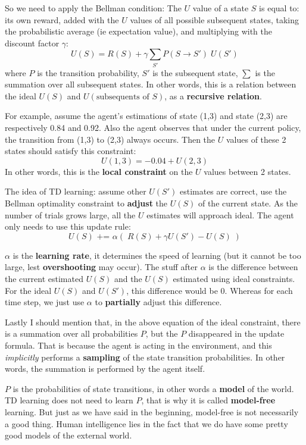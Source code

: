 \documentclass[orivec]{llncs}
\begin{document}
So we need to apply the Bellman condition:  The $U$ value of a state $S$ is equal to:  its own reward, added with the $U$ values of all possible subsequent states, taking the probabilistic average (ie expectation value), and multiplying with the discount factor $\gamma$:
$$ U(S) = R(S) + \gamma \sum_{S'} P(S \rightarrow S') \; U(S') $$
where $P$ is the transition probability, $S'$ is the subsequent state, $\sum$ is the summation over all subsequent states.  In other words, this is a relation between the ideal $U(S)$ and $U(\mbox{subsequents of }S)$, as a \textbf{recursive relation}.

For example, assume the agent's estimations of state (1,3) and state (2,3) are respectively 0.84 and 0.92.  Also the agent observes that under the current policy, the transition from (1,3) to (2,3) always occurs.  Then the $U$ values of these 2 states should satisfy this constraint:
$$ U(1,3) = -0.04 + U(2,3) $$
In other words, this is the \textbf{local constraint} on the $U$ values between 2 states.

The idea of TD learning:  assume other $U(S')$ estimates are correct, use the Bellman optimality constraint to \textbf{adjust} the $U(S)$ of the current state.  As the number of trials grows large, all the $U$ estimates will approach ideal.  The agent only needs to use this update rule:
$$ U(S) \mbox{  +=  } \alpha ( \; R(S) + \gamma U(S') - U(S) \; ) $$

$\alpha$ is the \textbf{learning rate}, it determines the speed of learning (but it cannot be too large, lest \textbf{overshooting} may occur).  The stuff after $\alpha$ is the difference between the current estimated $U(S)$ and the $U(S)$ estimated using ideal constraints.  For the ideal $U(S)$ and $U(S')$, this difference would be 0.  Whereas for each time step, we just use $\alpha$ to \textbf{partially} adjust this difference.

Lastly I should mention that, in the above equation of the ideal constraint, there is a summation over all probabilities $P$, but the $P$ disappeared in the update formula.  That is because the agent is acting in the environment, and this \textit{implicitly} performs a \textbf{sampling} of the state transition probabilities.  In other words, the summation is performed by the agent itself.

$P$ is the probabilities of state transitions, in other words a \textbf{model} of the world.  TD learning does not need to learn $P$, that is why it is called \textbf{model-free} learning.  But just as we have said in the beginning, model-free is not necessarily a good thing.  Human intelligence lies in the fact that we do have some pretty good models of the external world.
\end{document}
